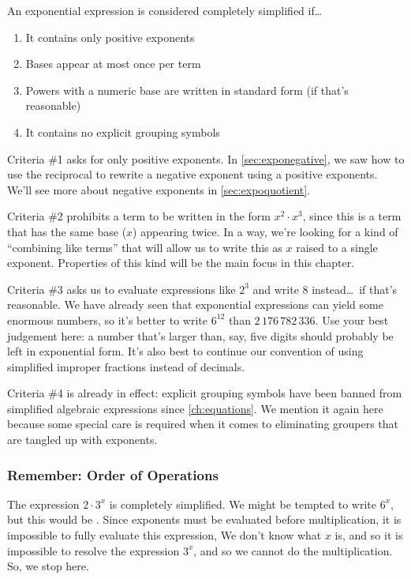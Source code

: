 \begin{boxedcriteria}
An exponential expression is considered completely simplified if\ldots
\begin{enumerate}
	\item It contains only positive exponents
	\item Bases appear at most once per term
	\item Powers with a numeric base are written in standard form (if that's reasonable)
	\item It contains no explicit grouping symbols
\end{enumerate}
\end{boxedcriteria}

Criteria \#1 asks for only positive exponents. In \cref{sec:exponegative}, we saw how to use the reciprocal to rewrite a negative exponent using a positive exponents. We'll see more about negative exponents in \cref{sec:expoquotient}.

Criteria \#2 prohibits a term to be written in the form $x^2 \cdot x^3$, since this is a term that has the same base ($x$) appearing twice. In a way, we're looking for a kind of ``combining like terms'' that will allow us to write this as $x$ raised to a single exponent. Properties of this kind will be the main focus in this chapter.

Criteria \#3 asks us to evaluate expressions like $2^3$ and write 8 instead\ldots\ if that's reasonable. We have already seen that exponential expressions can yield some enormous numbers, so it's better to write $6^{12}$ than $2\,176\,782\,336$. Use your best judgement here: a number that's larger than, say, five digits should probably be left in exponential form. It's also best to continue our convention of using simplified improper fractions instead of decimals.

Criteria \#4 is already in effect: explicit grouping symbols have been banned from simplified algebraic expressions since \cref{ch:equations}. We mention it again here because some special care is required when it comes to eliminating groupers that are tangled up with exponents.

\subsubsection{Remember: Order of Operations}

The expression $2 \cdot 3^x$ is completely simplified. We might be tempted to write $6^x$, but this would be \evilandwrong. Since exponents must be evaluated before multiplication, it is impossible to fully evaluate this expression, We don't know what $x$ is, and so it is impossible to resolve the expression $3^x$, and so we cannot do the multiplication. So, we stop here.

